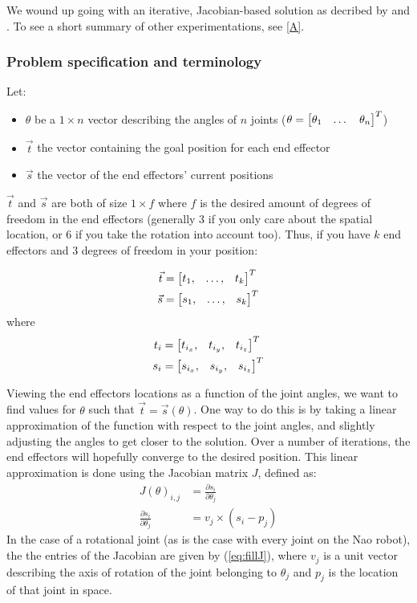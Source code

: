 \documentclass[a4paper]{article}
\begin{document}
We wound up going with an iterative, Jacobian-based solution as decribed by
\cite{Meredith2004} and \cite{Buss2009}. To see a short summary of other
experimentations, see \ref{A}.

\subsubsection{Problem specification and terminology}
Let:
\begin{itemize}
    \item $\theta$ be a $1 \times n$ vector describing the angles of $n$ joints
        ($\theta = \begin{bmatrix} \theta_1 & \dots & \theta_n \end{bmatrix}^T$)
    \item $\vec{t}$ the vector containing the goal position for each end effector
    \item $\vec{s}$ the vector of the end effectors' current positions
\end{itemize}

$\vec{t}$ and $\vec{s}$ are both of size $1 \times f$ where $f$ is the
desired amount of degrees of freedom in the end effectors (generally 3
if you only care about the spatial location, or 6 if you take the
rotation into account too).  Thus, if you have $k$ end effectors and 3
degrees of freedom in your position:

\begin{align*}
    \vec{t} &= \begin{bmatrix} t_1, &\dots, &t_k \end{bmatrix}^T \\
    \vec{s} &= \begin{bmatrix} s_1, &\dots, &s_k \end{bmatrix}^T
\end{align*}
where
\begin{align*}
    t_i &= \begin{bmatrix} t_{i_{x}}, &t_{i_{y}}, &t_{i_{z}} \end{bmatrix}^T \\
    s_i &= \begin{bmatrix} s_{i_{x}}, &s_{i_{y}}, &s_{i_{z}} \end{bmatrix}^T
\end{align*}

Viewing the end effectors locations as a function of the joint angles,
we want to find values for $\theta$ such that $\vec{t} =
\vec{s}(\theta)$. One way to do this is by taking a linear
approximation of the function with respect to the joint angles, and
slightly adjusting the angles to get closer to the solution.  Over a
number of iterations, the end effectors will hopefully converge to the
desired position.  This linear approximation is done using the
Jacobian matrix $J$, defined as:
\begin{align}
  J(\theta)_{i, j} &= \frac{\partial s_i}{\partial \theta_j} \\
  \frac{\partial s_i}{\partial \theta_j} &= v_j \times (s_i - p_j)    \label{eq:fillJ}
\end{align}
In the case of a rotational joint (as is the case with every joint on
the Nao robot), the the entries of the Jacobian are given by
(\ref{eq:fillJ}), where $v_j$ is a unit vector describing the axis of
rotation of the joint belonging to $\theta_j$ and $p_j$ is the
location of that joint in space.
\end{document}
